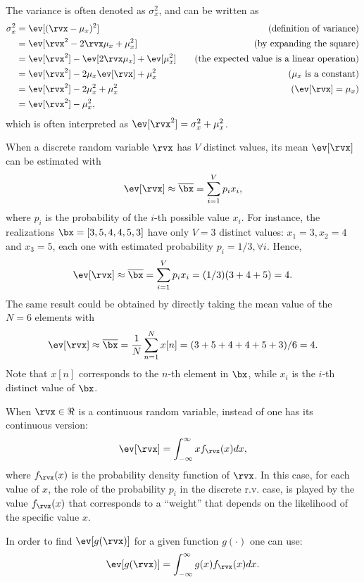 The variance is often denoted as $\sigma_x^2$, and can be written as
\begin{align}
\sigma_x^2 &=  \ev[(\rvx-\mu_x)^2] & \textrm{~~~(definition of variance)} \nonumber \\
&=  \ev[\rvx^2 - 2 \rvx \mu_x + \mu_x ^2] & \textrm{~~~(by expanding the square)} \nonumber \\
&=   \ev[\rvx^2] - \ev[2 \rvx \mu_x] + \ev[\mu_x ^2] & \textrm{~~~(the expected value is a linear operation)} \nonumber \\
&=   \ev[\rvx^2] - 2 \mu_x \ev[\rvx] + \mu_x ^2 & \textrm{~~~($\mu_x$ is a constant)} \nonumber \\
&=   \ev[\rvx^2] - 2 \mu_x^2 + \mu_x ^2 & \textrm{~~~($\ev[\rvx] = \mu_x$)} \nonumber \\
&=   \ev[\rvx^2] - \mu_x ^2, \label{eq:variance_alternative} & 
\end{align}
which is often interpreted as $\ev[\rvx^2] = \sigma_x^2 + \mu_x ^2$.

When a discrete random variable $\rvx$ has $V$ distinct values, its mean $\ev[\rvx]$ can be estimated with
\begin{equation}
\ev[\rvx] \approx \overline{\bx} = \sum_{i=1}^V p_i x_i,
\label{eq:ev_distinct_values}
\end{equation}
where $p_i$ is the probability of the $i$-th possible value $x_i$. 
For instance, the realizations $\bx=[3, 5, 4, 4, 5, 3]$ have only $V=3$ distinct values: $x_1=3, x_2=4$ and $x_3=5$, each one with estimated probability $p_i = 1/3, \forall i$. Hence, 
\[
\ev[\rvx] \approx \overline{\bx} = \sum_{i=1}^V p_i x_i = (1/3)(3 + 4 + 5) = 4.
\]
The same result could be obtained by directly taking the mean value of the $N=6$ elements with
\[
\ev[\rvx] \approx \overline{\bx} = \frac{1}{N} \sum_{n=1}^N x[n] = (3 + 5 + 4 + 4 + 5 + 3) / 6 = 4.
\]
Note that $x[n]$ corresponds to the $n$-th element in $\bx$, while $x_i$ is the $i$-th distinct value of $\bx$.

When $\rvx \in \Re$ is a continuous random variable, instead of  one has
its continuous version:
\[
\ev[\rvx] = \int_{-\infty}^{\infty} x f_{\rvx}(x)  dx,
\]
where $f_{\rvx}(x)$ is the probability density function of $\rvx$. In this case, for each value of $x$, the role of 
the probability $p_i$ in the discrete r.v. case, is played by the value $f_{\rvx}(x)$ that corresponds to a ``weight'' that
depends on the likelihood of the specific value $x$.

In order to find $\ev[g(\rvx)]$ for a given function $g(\cdot)$ one can use:
\begin{equation}
\ev[g(\rvx)] = \int_{-\infty}^{\infty} g(x) f_{\rvx}(x)  dx.
\label{eq:function_continuous_rv}
\end{equation}

